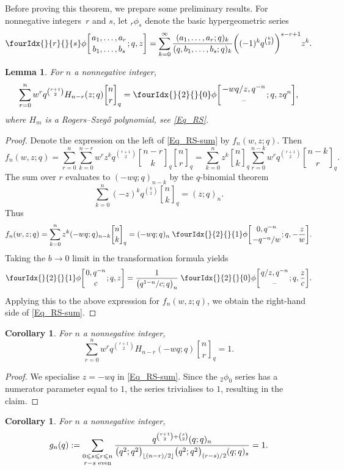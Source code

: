 \documentclass[pdftex]{sigma}
\numberwithin{equation}{section}
\newtheorem{Corollary}[Theorem]{Corollary}
\newtheorem{Lemma}[Theorem]{Lemma}
\newcommand{\qhyp}[5]{\fourIdx{}{#1}{}{#2}\phi
\bigg[\genfrac{}{}{0pt}{}{#3}{#4};#5\bigg]}
\renewcommand{\leq}{\leqslant}
\newcommand{\floor}[1]{\lfloor#1\rfloor}
\newcommand{\qbin}[2]{\genfrac{[}{]}{0pt}{}{#1}{#2}}
\begin{document}
Before proving this theorem, we prepare some preliminary results.
For nonnegative integers~$r$ and $s$, let ${_r\phi_s}$ denote the
basic hypergeometric series
\[
\qhyp{r}{s}{a_1,\dots,a_r}{b_1,\dots,b_s}{q,z}=
\sum_{k=0}^{\infty} \frac{(a_1,\dots,a_r;q)_k}{(q,b_1,\dots,b_s;q)_k}
\biggl((-1)^k q^{\binom{k}{2}}\biggr)^{s-r+1} z^k.
\]

\begin{Lemma}
For $n$ a nonnegative integer,
\begin{equation}\label{Eq_RS-sum}
\sum_{r=0}^n w^r q^{\binom{r+1}{2}} H_{n-r}(z;q)\qbin{n}{r}_q=
\qhyp{2}{0}{-wq/z,q^{-n}}{\text{--}}{q,zq^n},
\end{equation}
where $H_m$ is a Rogers--Szeg\H{o} polynomial, see \eqref{Eq_RS}.
\end{Lemma}

\begin{proof}
Denote the expression on the left of \eqref{Eq_RS-sum} by $f_n(w,z;q)$.
Then
\[
f_n(w,z;q)
=\sum_{r=0}^n \sum_{k=0}^{n-r}
w^r z^k q^{\binom{r+1}{2}} \qbin{n-r}{k}_q\qbin{n}{r}_q
=\sum_{k=0}^n z^k \qbin{n}{k}_q
\sum_{r=0}^{n-k} w^r q^{\binom{r+1}{2}} \qbin{n-k}{r}_q.
\]
The sum over $r$ evaluates to $(-wq;q)_{n-k}$ by
the $q$-binomial theorem \cite[equation~(II.4)]{GR04}
\[
\sum_{k=0}^n (-z)^k q^{\binom{k}{2}}\qbin{n}{k}_q=(z;q)_n.
\]
Thus
\[
f_n(w,z;q)=\sum_{k=0}^n z^k (-wq;q)_{n-k} \qbin{n}{k}_q
=(-wq;q)_n\;\qhyp{2}{1}{0,q^{-n}}{-q^{-n}/w}{q,-\frac{z}{w}}.
\]
Taking the $b\to 0$ limit in the transformation formula
\cite[equation~(III.8)]{GR04} yields
\[
\qhyp{2}{1}{0,q^{-n}}{c}{q,z}=\frac{1}{\bigl(q^{1-n}/c;q\bigr)_n}\;
\qhyp{2}{0}{q/z,q^{-n}}{\text{--}}{q,\frac{z}{c}}.
\]
Applying this to the above expression for $f_n(w,z;q)$, we obtain
the right-hand side of \eqref{Eq_RS-sum}.
\end{proof}

\begin{Corollary}\label{Cor_sumtoone}
For $n$ a nonnegative integer,
\[
\sum_{r=0}^n w^r q^{\binom{r+1}{2}} H_{n-r}(-wq;q)\qbin{n}{r}_q=1.
\]
\end{Corollary}

\begin{proof}
We specialise $z=-wq$ in \eqref{Eq_RS-sum}.
Since the ${_2\phi_0}$ series has a numerator parameter equal to $1$, the series
trivialises to $1$, resulting in the claim.
\end{proof}

\begin{Corollary}\label{Cor_rs-sum}
For $n$ a nonnegative integer,
\begin{equation*}%
g_n(q):=\sum_{\substack{0\leq s\leq r\leq n\\[1pt] r-s \textup{ even}}}
\frac{q^{\binom{r+1}{2}+\binom{s}{2}}(q;q)_n}
{\bigl(q^2;q^2\bigr)_{\floor{(n-r)/2}}\bigl(q^2;q^2\bigr)_{(r-s)/2}
(q;q)_s}=1.
\end{equation*}
\end{Corollary}
\end{document}
